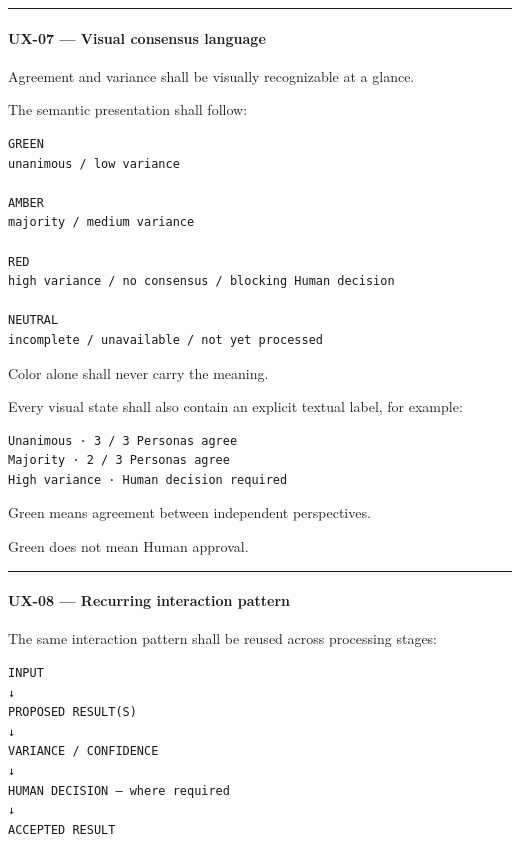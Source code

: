 \begin{center}\rule{0.5\linewidth}{0.5pt}\end{center}

\hypertarget{ux-07--visual-consensus-language}{%
\paragraph{UX-07 --- Visual consensus language}\label{ux-07--visual-consensus-language}}

Agreement and variance shall be visually recognizable at a glance.

The semantic presentation shall follow:

\begin{verbatim}
GREEN
unanimous / low variance

AMBER
majority / medium variance

RED
high variance / no consensus / blocking Human decision

NEUTRAL
incomplete / unavailable / not yet processed
\end{verbatim}

Color alone shall never carry the meaning.

Every visual state shall also contain an explicit textual label, for example:

\begin{verbatim}
Unanimous · 3 / 3 Personas agree
Majority · 2 / 3 Personas agree
High variance · Human decision required
\end{verbatim}

Green means agreement between independent perspectives.

Green does not mean Human approval.

\begin{center}\rule{0.5\linewidth}{0.5pt}\end{center}

\hypertarget{ux-08--recurring-interaction-pattern}{%
\paragraph{UX-08 --- Recurring interaction pattern}\label{ux-08--recurring-interaction-pattern}}

The same interaction pattern shall be reused across processing stages:

\begin{verbatim}
INPUT
↓
PROPOSED RESULT(S)
↓
VARIANCE / CONFIDENCE
↓
HUMAN DECISION — where required
↓
ACCEPTED RESULT
\end{verbatim}

